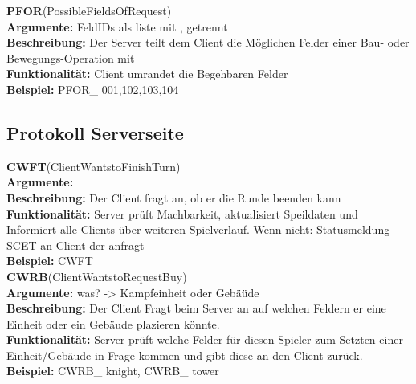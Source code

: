 \documentclass[a4paper, 12pt, oneside, headsepline=.5pt,footsepline=.5pt]{scrartcl}
\begin{document}
{\large \textbf{PFOR}(PossibleFieldsOfRequest)} \\
\hspace{4ex} \textbf{Argumente:} {FeldIDs als liste mit , getrennt} \\
\hspace{4ex} \textbf{Beschreibung:} {Der Server teilt dem Client die Möglichen Felder einer Bau- oder Bewegungs-Operation mit} \\
\hspace{4ex} \textbf{Funktionalität:} {Client umrandet die Begehbaren Felder} \\
\hspace{4ex} \textbf{Beispiel:} {PFOR\_ 001,102,103,104} \\

\subsection{Protokoll Serverseite} 

{\large \textbf{CWFT}(ClientWantstoFinishTurn)} \\
\hspace{4ex} \textbf{Argumente:} {} \\
\hspace{4ex} \textbf{Beschreibung:} {Der Client fragt an, ob er die Runde beenden kann} \\
\hspace{4ex} \textbf{Funktionalität:} {Server prüft Machbarkeit, aktualisiert Speildaten und Informiert alle Clients über weiteren Spielverlauf. Wenn nicht: Statusmeldung SCET an Client der anfragt} \\
\hspace{4ex} \textbf{Beispiel:} {CWFT} \\

{\large \textbf{CWRB}(ClientWantstoRequestBuy)} \\
\hspace{4ex} \textbf{Argumente:} {was? -> Kampfeinheit oder Gebäüde} \\
\hspace{4ex} \textbf{Beschreibung:} {Der Client Fragt beim Server an auf welchen Feldern er eine Einheit oder ein Gebäude plazieren könnte.} \\
\hspace{4ex} \textbf{Funktionalität:} {Server prüft welche Felder für diesen Spieler zum Setzten einer Einheit/Gebäude in Frage kommen und gibt diese an den Client zurück.} \\
\hspace{4ex} \textbf{Beispiel:} {CWRB\_ knight, CWRB\_ tower} \\
\end{document}

